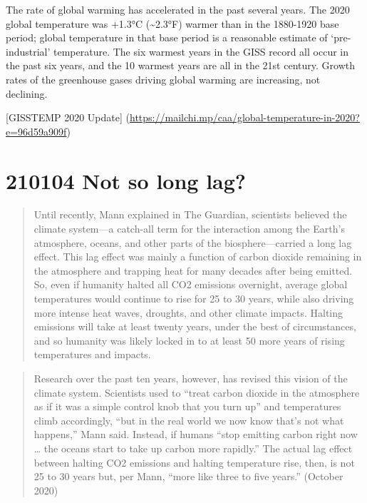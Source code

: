 \documentclass[
]{book}
\begin{document}
The rate of global warming has accelerated in the past several years. The 2020 global temperature was +1.3°C (\textasciitilde2.3°F) warmer than in the 1880-1920 base period; global temperature in that base period is a reasonable estimate of `pre-industrial' temperature. The six warmest years in the GISS record all occur in the past six years, and the 10 warmest years are all in the 21st century. Growth rates of the greenhouse gases driving global warming are increasing, not declining.

{[}GISSTEMP 2020 Update{]} (\url{https://mailchi.mp/caa/global-temperature-in-2020?e=96d59a909f})

\hypertarget{not-so-long-lag}{%
\section{210104 Not so long lag?}\label{not-so-long-lag}}

\begin{quote}
Until recently, Mann explained in The Guardian, scientists believed the climate system---a catch-all term for the interaction among the Earth's atmosphere, oceans, and other parts of the biosphere---carried a long lag effect. This lag effect was mainly a function of carbon dioxide remaining in the atmosphere and trapping heat for many decades after being emitted. So, even if humanity halted all CO2 emissions overnight, average global temperatures would continue to rise for 25 to 30 years, while also driving more intense heat waves, droughts, and other climate impacts. Halting emissions will take at least twenty years, under the best of circumstances, and so humanity was likely locked in to at least 50 more years of rising temperatures and impacts.
\end{quote}

\begin{quote}
Research over the past ten years, however, has revised this vision of the climate system. Scientists used to ``treat carbon dioxide in the atmosphere as if it was a simple control knob that you turn up'' and temperatures climb accordingly, ``but in the real world we now know that's not what happens,'' Mann said. Instead, if humans ``stop emitting carbon right now \ldots{} the oceans start to take up carbon more rapidly.'' The actual lag effect between halting CO2 emissions and halting temperature rise, then, is not 25 to 30 years but, per Mann, ``more like three to five years.''
(October 2020)
\end{quote}
\end{document}
